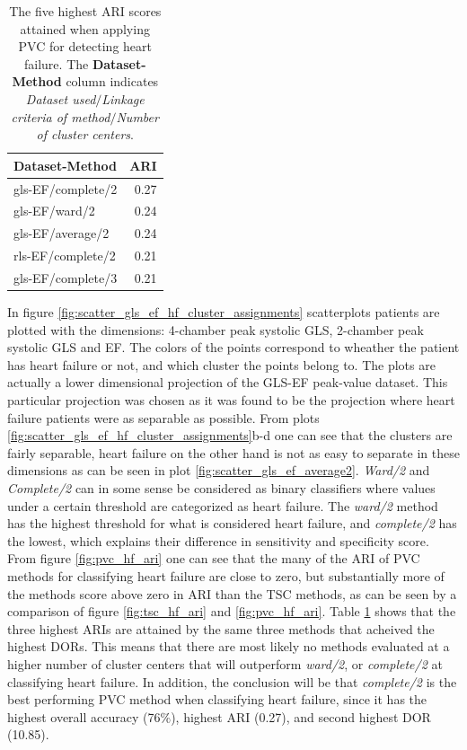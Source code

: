 \begin{table}[htb]
    \centering
    \begin{tabular}{lr}
        \toprule
        Dataset-Method    &  ARI \\
        \midrule
        gls-EF/complete/2 & 0.27 \\
        gls-EF/ward/2     & 0.24 \\
        gls-EF/average/2  & 0.24 \\
        rls-EF/complete/2 & 0.21 \\
        gls-EF/complete/3 & 0.21 \\
        \bottomrule
    \end{tabular}
    \caption{The five highest ARI scores attained when applying PVC for detecting heart failure.
             The \textbf{Dataset-Method} column indicates \textit{Dataset used}$/$\textit{Linkage criteria of method}$/$\textit{Number of cluster centers}.}
    \label{tab:pvc_hf_ari}
\end{table}

In figure \ref{fig:scatter_gls_ef_hf_cluster_assignments} scatterplots patients are plotted with the dimensions: 4-chamber peak systolic GLS, 2-chamber peak systolic GLS and EF. 
The colors of the points correspond to wheather the patient has heart failure or not, and which cluster the points belong to.
The plots are actually a lower dimensional projection of the GLS-EF peak-value dataset. 
This particular projection was chosen as it was found to be the projection where heart failure patients were as separable as possible. 
From plots \ref{fig:scatter_gls_ef_hf_cluster_assignments}b-d one can see that the clusters are fairly separable, 
heart failure on the other hand is not as easy to separate in these dimensions as can be seen in plot \ref{fig:scatter_gls_ef_average2}. 
\textit{Ward/2} and \textit{Complete/2} can in some sense be considered as binary classifiers where values under a certain threshold are categorized as heart failure.
The \textit{ward/2} method has the highest threshold for what is considered heart failure, and \textit{complete/2} has the lowest, 
which explains their difference in sensitivity and specificity score. 
From figure \ref{fig:pvc_hf_ari} one can see that the many of the ARI of PVC methods for classifying heart failure are close to zero, but substantially more of the methods score above zero in ARI
than the TSC methods, as can be seen by a comparison of figure \ref{fig:tsc_hf_ari} and \ref{fig:pvc_hf_ari}. Table \ref{tab:pvc_hf_ari} shows that the three highest ARIs are attained by the same
three methods that acheived the highest DORs. This means that there are most likely no methods evaluated at a higher number of cluster centers that will outperform \textit{ward/2},
or \textit{complete/2} at classifying heart failure. In addition, the conclusion will be that \textit{complete/2} is the best performing PVC method when classifying heart failure, 
since it has the highest overall accuracy (76$\%$), highest ARI (0.27), and second highest DOR (10.85). 

